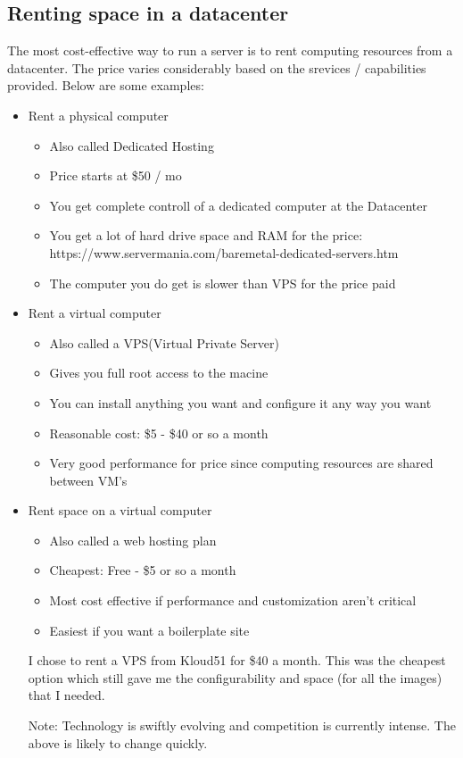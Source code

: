 \subsection{Renting space in a datacenter}

The most cost-effective way to run a server is to rent computing resources from a datacenter.  The price varies considerably based on the srevices / capabilities provided.  Below are some examples:

\begin{itemize}
    \item Rent a physical computer
    \begin{itemize}
        \item Also called Dedicated Hosting
        \item Price starts at \$50 / mo
        \item You get complete controll of a dedicated computer at the Datacenter
        \item You get a lot of hard drive space and RAM for the price: https://www.servermania.com/baremetal-dedicated-servers.htm
        \item The computer you do get is slower than VPS for the price paid
    \end{itemize}

    \item Rent a virtual computer
    \begin{itemize}
        \item Also called a VPS(Virtual Private Server)
        \item Gives you full root access to the macine
        \item You can install anything you want and configure it any way you want
        \item Reasonable cost:  \$5 - \$40 or so a month
        \item Very good performance for price since computing resources are shared between VM's
    \end{itemize}

    \item Rent space on a virtual computer
    \begin{itemize}
        \item Also called a web hosting plan
        \item Cheapest:  Free - \$5 or so a month
        \item Most cost effective if performance and customization aren't critical
        \item Easiest if you want a boilerplate site
        
    \end{itemize}

    I chose to rent a VPS from Kloud51 for \$40 a month.  This was the cheapest option which still gave me the configurability and space (for all the images) that I needed.
    
    Note: Technology is swiftly evolving and competition is currently intense. The above is likely to change quickly.
    
\end{itemize}




